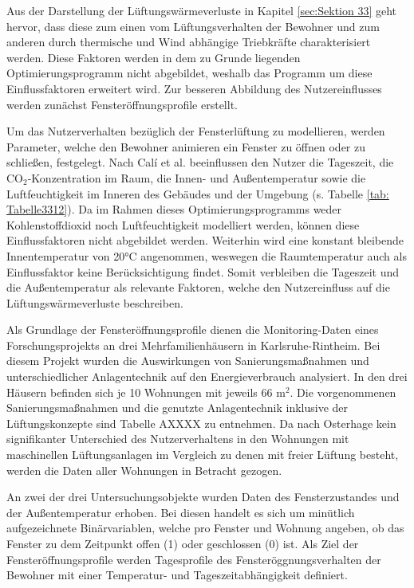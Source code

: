 Aus der Darstellung der Lüftungswärmeverluste in Kapitel \ref{sec:Sektion 33} geht hervor, dass diese zum einen vom Lüftungsverhalten der Bewohner und zum anderen durch thermische und Wind abhängige Triebkräfte charakterisiert werden.
Diese Faktoren werden in dem zu Grunde liegenden Optimierungsprogramm nicht abgebildet, weshalb das Programm um diese Einflussfaktoren erweitert wird.
Zur besseren Abbildung des Nutzereinflusses werden zunächst Fensteröffnungsprofile erstellt.

Um das Nutzerverhalten bezüglich der Fensterlüftung zu modellieren, werden Parameter, welche den Bewohner animieren ein Fenster zu öffnen oder zu schließen, festgelegt.
Nach Calí et al. beeinflussen den Nutzer die Tageszeit, die CO\(_2\)-Konzentration im Raum, die Innen- und Außentemperatur sowie die Luftfeuchtigkeit im Inneren des Gebäudes und der Umgebung (s. Tabelle \ref{tab: Tabelle3312}).
Da im Rahmen dieses Optimierungsprogramms weder Kohlenstoffdioxid noch Luftfeuchtigkeit modelliert werden, können diese Einflussfaktoren nicht abgebildet werden.
Weiterhin wird eine konstant bleibende Innentemperatur von 20°C angenommen, weswegen die Raumtemperatur auch als Einflussfaktor keine Berücksichtigung findet.
Somit verbleiben die Tageszeit und die Außentemperatur als relevante Faktoren, welche den Nutzereinfluss auf die Lüftungswärmeverluste beschreiben.

Als Grundlage der Fensteröffnungsprofile dienen die Monitoring-Daten eines Forschungsprojekts an drei Mehrfamilienhäusern in Karlsruhe-Rintheim.
Bei diesem Projekt wurden die Auswirkungen von Sanierungsmaßnahmen und unterschiedlicher Anlagentechnik auf den Energieverbrauch analysiert.
In den drei Häusern befinden sich je 10 Wohnungen mit jeweils 66 m\(^2\).
Die vorgenommenen Sanierungsmaßnahmen und die genutzte Anlagentechnik inklusive der Lüftungskonzepte sind Tabelle AXXXX zu entnehmen.
Da nach Osterhage \cite{Osterhage.2018} kein signifikanter Unterschied des Nutzerverhaltens in den Wohnungen mit maschinellen Lüftungsanlagen im Vergleich zu denen mit freier Lüftung besteht, werden die Daten aller Wohnungen in Betracht gezogen.

An zwei der drei Untersuchungsobjekte wurden Daten des Fensterzustandes und der Außentemperatur erhoben.
Bei diesen handelt es sich um minütlich aufgezeichnete Binärvariablen, welche pro Fenster und Wohnung angeben, ob das Fenster zu dem Zeitpunkt offen (1) oder geschlossen (0) ist.
Als Ziel der Fensteröffnungsprofile werden Tagesprofile des Fensteröggnungsverhalten der Bewohner mit einer Temperatur- und Tageszeitabhängigkeit definiert.

